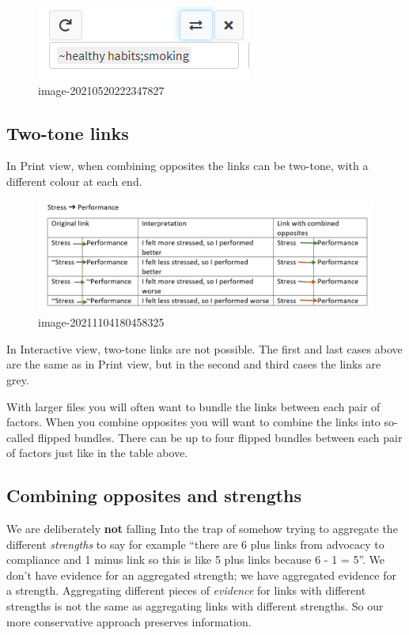 \documentclass[
]{book}
\begin{document}
\begin{figure}
\centering
\includegraphics{_assets/image-20210520222347827.png}
\caption{image-20210520222347827}
\end{figure}

\hypertarget{two-tone-links}{%
\subsection{Two-tone links}\label{two-tone-links}}

In Print view, when combining opposites the links can be two-tone, with a different colour at each end.

\begin{figure}
\centering
\includegraphics[width=6.77083in,height=\textheight]{_assets/image-20211104180458325.png}
\caption{image-20211104180458325}
\end{figure}

In Interactive view, two-tone links are not possible. The first and last cases above are the same as in Print view, but in the second and third cases the links are grey.

With larger files you will often want to bundle the links between each pair of factors. When you combine opposites you will want to combine the links into so-called flipped bundles. There can be up to four flipped bundles between each pair of factors just like in the table above.

\hypertarget{combining-opposites-and-strengths}{%
\subsection{Combining opposites and strengths}\label{combining-opposites-and-strengths}}

We are deliberately \textbf{not} falling Into the trap of somehow trying to aggregate the different \emph{strengths} to say for example ``there are 6 plus links from advocacy to compliance and 1 minus link so this is like 5 plus links because 6 - 1 = 5''. We don't have evidence for an aggregated strength; we have aggregated evidence for a strength. Aggregating different pieces of \emph{evidence} for links with different strengths is not the same as aggregating links with different strengths. So our more conservative approach preserves information.
\end{document}
